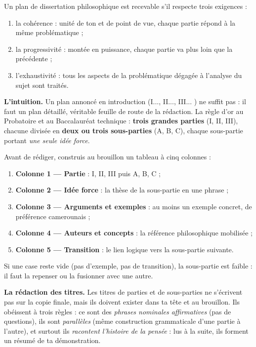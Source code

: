 \documentclass[11pt]{article}
\newcommand{\cle}[1]{{\popxbold\color{popdark}#1}}
\newcounter{popsec}
\newcounter{popsub}
\newcommand{\courssub}[1]{%
  \stepcounter{popsub}%
  \par\vspace{9pt}\noindent{\popxbold\fontsize{11.5}{13}\selectfont\color{popink}{\color{poporange}\thepopsec.\thepopsub}\hspace{6pt}#1}\par\nopagebreak\vspace{4pt}
}
\begin{document}
\begin{propriete}
Un plan de dissertation philosophique est recevable s'il respecte trois exigences :
\begin{enumerate}
\item la \cle{cohérence} : unité de ton et de point de vue, chaque partie répond à la même problématique ;
\item la \cle{progressivité} : montée en puissance, chaque partie va plus loin que la précédente ;
\item l'\cle{exhaustivité} : tous les aspects de la problématique dégagée à l'analyse du sujet sont traités.
\end{enumerate}
\end{propriete}

\courssub{La construction du plan détaillé}

\textbf{L'intuition.} Un plan annoncé en introduction (\og I..., II..., III... \fg{}) ne suffit pas : il faut un \cle{plan détaillé}, véritable feuille de route de la rédaction. La règle d'or au Probatoire et au Baccalauréat technique : \textbf{trois grandes parties} (I, II, III), chacune divisée en \textbf{deux ou trois sous-parties} (A, B, C), chaque sous-partie portant \emph{une seule idée force}.

\begin{methode}
Avant de rédiger, construis au brouillon un tableau à cinq colonnes :
\begin{enumerate}
\item \textbf{Colonne 1 — Partie} : I, II, III puis A, B, C ;
\item \textbf{Colonne 2 — Idée force} : la thèse de la sous-partie en une phrase ;
\item \textbf{Colonne 3 — Arguments et exemples} : au moins un exemple concret, de préférence camerounais ;
\item \textbf{Colonne 4 — Auteurs et concepts} : la référence philosophique mobilisée ;
\item \textbf{Colonne 5 — Transition} : le lien logique vers la sous-partie suivante.
\end{enumerate}
Si une case reste vide (pas d'exemple, pas de transition), la sous-partie est faible : il faut la repenser ou la fusionner avec une autre.
\end{methode}

\textbf{La rédaction des titres.} Les titres de parties et de sous-parties ne s'écrivent pas sur la copie finale, mais ils doivent exister dans ta tête et au brouillon. Ils obéissent à trois règles : ce sont des \emph{phrases nominales affirmatives} (pas de questions), ils sont \emph{parallèles} (même construction grammaticale d'une partie à l'autre), et surtout ils \emph{racontent l'histoire de la pensée} : lus à la suite, ils forment un résumé de ta démonstration.
\end{document}

